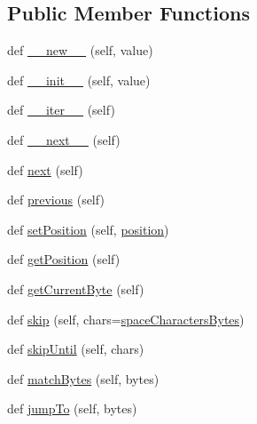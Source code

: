 \subsection*{Public Member Functions}
\begin{DoxyCompactItemize}
\item 
def \hyperlink{classpip_1_1__vendor_1_1html5lib_1_1__inputstream_1_1EncodingBytes_afc5268c43e35d41be7fc405e857e0e00}{\+\_\+\+\_\+new\+\_\+\+\_\+} (self, value)
\item 
def \hyperlink{classpip_1_1__vendor_1_1html5lib_1_1__inputstream_1_1EncodingBytes_a0706975caca24c4aa25964d4e15b6e3d}{\+\_\+\+\_\+init\+\_\+\+\_\+} (self, value)
\item 
def \hyperlink{classpip_1_1__vendor_1_1html5lib_1_1__inputstream_1_1EncodingBytes_a7e0d07188264f67835e6eb4fb1c94cda}{\+\_\+\+\_\+iter\+\_\+\+\_\+} (self)
\item 
def \hyperlink{classpip_1_1__vendor_1_1html5lib_1_1__inputstream_1_1EncodingBytes_a328b56cc9d2debf3c0dd6ef634fbc924}{\+\_\+\+\_\+next\+\_\+\+\_\+} (self)
\item 
def \hyperlink{classpip_1_1__vendor_1_1html5lib_1_1__inputstream_1_1EncodingBytes_ad823c9a351bc43351e9d04d27accb371}{next} (self)
\item 
def \hyperlink{classpip_1_1__vendor_1_1html5lib_1_1__inputstream_1_1EncodingBytes_a4b26462aa94c33c799e88eaf88484dd6}{previous} (self)
\item 
def \hyperlink{classpip_1_1__vendor_1_1html5lib_1_1__inputstream_1_1EncodingBytes_a92f1071710b0a4c5c8524a1821fe698b}{set\+Position} (self, \hyperlink{classpip_1_1__vendor_1_1html5lib_1_1__inputstream_1_1EncodingBytes_a15d3dcc692c2d97e8988082b2b21ebbd}{position})
\item 
def \hyperlink{classpip_1_1__vendor_1_1html5lib_1_1__inputstream_1_1EncodingBytes_a12c343802ad385d8c1fc0312dc53e946}{get\+Position} (self)
\item 
def \hyperlink{classpip_1_1__vendor_1_1html5lib_1_1__inputstream_1_1EncodingBytes_af4c58082bbb3647784ff91b89c730ce8}{get\+Current\+Byte} (self)
\item 
def \hyperlink{classpip_1_1__vendor_1_1html5lib_1_1__inputstream_1_1EncodingBytes_a01451aa89417976e37ec3f9aecf5e219}{skip} (self, chars=\hyperlink{namespacepip_1_1__vendor_1_1html5lib_1_1__inputstream_aeb15a38012f4cc3525cf485fb8760b46}{space\+Characters\+Bytes})
\item 
def \hyperlink{classpip_1_1__vendor_1_1html5lib_1_1__inputstream_1_1EncodingBytes_ae200fecff6e5d7e83e542c746e7c7515}{skip\+Until} (self, chars)
\item 
def \hyperlink{classpip_1_1__vendor_1_1html5lib_1_1__inputstream_1_1EncodingBytes_abde0832ece5df8058167a6b3cf910786}{match\+Bytes} (self, bytes)
\item 
def \hyperlink{classpip_1_1__vendor_1_1html5lib_1_1__inputstream_1_1EncodingBytes_ae808cdf2bb798bffbe1aa8870246731b}{jump\+To} (self, bytes)
\end{DoxyCompactItemize}
